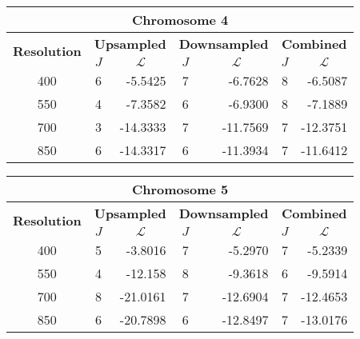 \begin{table}[h!]
  \centering
\begin{tabular}{|c|c|r|c|r|c|r|}\hline
\multicolumn{7}{|c|}{\textbf{Chromosome 4}} \\ \hline
\multirow{2}{*}{\textbf{Resolution}} & \multicolumn{2}{|c|}{\textbf{Upsampled}} &  \multicolumn{2}{|c|}{\textbf{Downsampled}} &  \multicolumn{2}{|c|}{\textbf{Combined}} \\ \cline{2-7}
    & $J$ & \multicolumn{1}{|c|}{\textbf{$\mathcal{L}$}} & $J$ & \multicolumn{1}{|c|}{\textbf{$\mathcal{L}$}} &$J$ & \multicolumn{1}{|c|}{\textbf{$\mathcal{L}$}}   \\ \hline
400 & 6 & -5.5425 & 7 & -6.7628 & 8 & -6.5087  \\ \hline
550 & 4 & -7.3582 & 6 & -6.9300 & 8 & -7.1889  \\ \hline
700 & 3 & -14.3333 & 7 & -11.7569 & 7 & -12.3751  \\ \hline
850 & 6 & -14.3317 & 6 & -11.3934 & 7 & -11.6412   \\ \hline
\end{tabular}
\end{table}

\begin{table}[h!]
  \centering
\begin{tabular}{|c|c|r|c|r|c|r|}\hline
\multicolumn{7}{|c|}{\textbf{Chromosome 5}} \\ \hline
\multirow{2}{*}{\textbf{Resolution}} & \multicolumn{2}{|c|}{\textbf{Upsampled}} &  \multicolumn{2}{|c|}{\textbf{Downsampled}} &  \multicolumn{2}{|c|}{\textbf{Combined}} \\ \cline{2-7}
    & $J$ & \multicolumn{1}{|c|}{\textbf{$\mathcal{L}$}} & $J$ & \multicolumn{1}{|c|}{\textbf{$\mathcal{L}$}} &$J$ & \multicolumn{1}{|c|}{\textbf{$\mathcal{L}$}}   \\ \hline
400 & 5 & -3.8016 & 7 & -5.2970 & 7 & -5.2339  \\ \hline
550 & 4 & -12.158 & 8 & -9.3618 & 6 & -9.5914  \\ \hline
700 & 8 & -21.0161 & 7 & -12.6904 & 7 & -12.4653  \\ \hline
850 & 6 & -20.7898 & 6 & -12.8497 & 7 & -13.0176  \\ \hline
\end{tabular}
\end{table}

